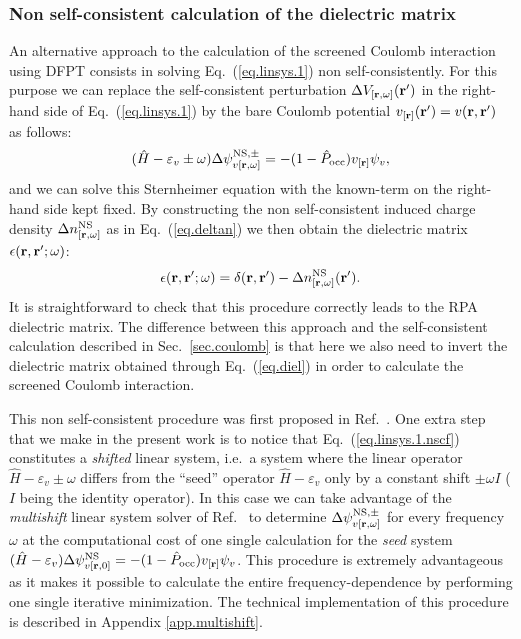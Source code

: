 \documentclass[twocolumn,prb,showpacs,superscriptaddress]{revtex4}
\def\w{\omega}
\def\H{\hat{H}}
\def\P{\hat{P}_{\rm occ}}
\def\E{\varepsilon}
\def\r{{\bf r}}
\def\rp{{\bf r^\prime}}
\begin{document}
\subsubsection{Non self-consistent calculation of the dielectric matrix}\label{sec.diel.nscf}

An alternative approach to the calculation of the screened Coulomb interaction
using DFPT consists in solving Eq.\ (\ref{eq.linsys.1}) non self-consistently.
For this purpose we can replace the self-consistent perturbation $\Delta V_{[\r,\w]}(\rp)$
in the right-hand side of Eq.\ (\ref{eq.linsys.1}) by the bare Coulomb potential
$v_{[\r]}(\rp)=v(\r,\rp)$ as follows:
  \begin{equation}\label{eq.linsys.1.nscf}
  (\H-\E_v\pm\w) \Delta \psi^{{\rm NS},\pm}_{v[\r,\w]}  = -(1-\P)  v_{[\r]} \psi_v, 
  \end{equation}
and we can solve this Sternheimer equation with the known-term on the right-hand side
kept fixed. By constructing the non self-consistent induced charge density $\Delta n^{\rm NS}_{[\r,\w]}$ as in Eq.\ (\ref{eq.deltan})
we then obtain the dielectric matrix $\epsilon(\r,\rp;\w)$:
  \begin{equation}\label{eq.diel}
  \epsilon(\r,\rp;\w) = \delta(\r,\rp) - \Delta n^{\rm NS}_{[\r,\w]}(\rp).
  \end{equation}
It is straightforward to check that this procedure correctly leads to the RPA
dielectric matrix.\cite{hl86-prb}
The difference between this approach and the self-consistent calculation described in
Sec.\ \ref{sec.coulomb} is that here we also need to invert the dielectric matrix obtained
through Eq.\ (\ref{eq.diel}) in order to calculate the screened Coulomb interaction.

This non self-consistent procedure was first proposed in Ref.\ .
One extra step that we make in the present work is to notice that Eq.\ (\ref{eq.linsys.1.nscf})
constitutes a {\it shifted} linear system, i.e.\ a system where the linear operator
$\H-\E_v\pm\w$ differs from the ``seed'' operator $\H-\E_v$ only by a constant shift $\pm\w I$ 
($I$ being the identity operator). 
In this case we can take
advantage of the {\it multishift} linear system solver of Ref.\ 
to determine $\Delta \psi^{{\rm NS},\pm}_{v[\r,\w]}$ for every frequency $\w$
at the computational cost of one single calculation for the {\it seed} system $(\H-\E_v) \Delta \psi^{{\rm NS}}_{v[\r,0]}  = -(1-\P)  v_{[\r]} \psi_v$.
This procedure is extremely advantageous as it makes it possible to calculate the entire frequency-dependence 
by performing one single iterative minimization. 
The technical implementation of this procedure is described in Appendix \ref{app.multishift}.
\end{document}
